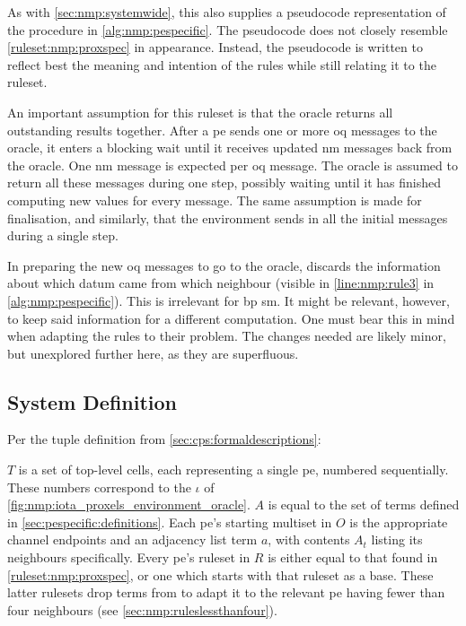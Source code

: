 As with \cref{sec:nmp:systemwide}, this  also supplies a pseudocode representation of the procedure in \cref{alg:nmp:pespecific}.  The pseudocode does not closely resemble \cref{ruleset:nmp:proxspec} in appearance.  Instead, the pseudocode is written to reflect best the meaning and intention of the rules while still relating it to the ruleset.

An important assumption for this ruleset is that the oracle returns all outstanding results together.  After a \gls{pe} sends one or more \gls{oq} messages to the oracle, it enters a blocking wait until it receives updated \gls{nm} messages back from the oracle.  One \gls{nm} message is expected per \gls{oq} message.  The oracle is assumed to return all these messages during one step, possibly waiting until it has finished computing new values for every message.  The same assumption is made for finalisation, and similarly, that the environment sends in all the initial messages during a single step.

In preparing the new \gls{oq} messages to go to the oracle,  discards the information about which datum came from which neighbour (visible in \cref{line:nmp:rule3} in \cref{alg:nmp:pespecific}).  This is irrelevant for \gls{bp} \gls{sm}.  It might be relevant, however, to keep said information for a different computation.  One must bear this in mind when adapting the rules to their problem.  The changes needed are likely minor, but unexplored further here, as they are superfluous.

\subsection{System Definition}
Per the tuple definition from \cref{sec:cps:formaldescriptions}:


\(T\) is a set of top-level cells, each representing a single \gls{pe}, numbered sequentially.  These numbers correspond to the \(\iota\) of \cref{fig:nmp:iota_proxels_environment_oracle}.  \(A\) is equal to the set of terms defined in \cref{sec:pespecific:definitions}.  Each \gls{pe}'s starting multiset in \(O\) is the appropriate channel endpoints and an adjacency list term \(a\), with contents \(A_t\) listing its neighbours specifically.  Every \gls{pe}'s ruleset in \(R\) is either equal to that found in \cref{ruleset:nmp:proxspec}, or one which starts with that ruleset as a base.  These latter rulesets drop terms from  to adapt it to the relevant \gls{pe} having fewer than four neighbours (see \cref{sec:nmp:ruleslessthanfour}).

